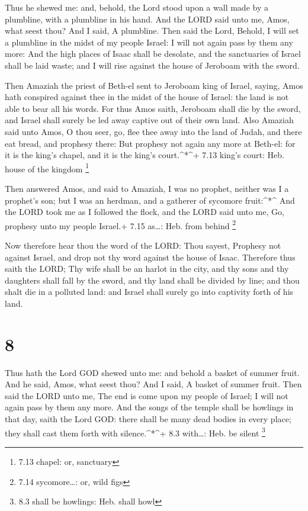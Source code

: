  Thus he shewed me: and, behold, the Lord stood upon a wall
made by a plumbline, with a plumbline in his hand.  And the
LORD said unto me, Amos, what seest thou? And I said, A plumbline. Then
said the Lord, Behold, I will set a plumbline in the midst of my people
Israel: I will not again pass by them any more:  And the
high places of Isaac shall be desolate, and the sanctuaries of Israel
shall be laid waste; and I will rise against the house of Jeroboam with
the sword.

 Then Amaziah the priest of Beth-el sent to Jeroboam king
of Israel, saying, Amos hath conspired against thee in the midst of the
house of Israel: the land is not able to bear all his words.
 For thus Amos saith, Jeroboam shall die by the sword, and
Israel shall surely be led away captive out of their own land.
 Also Amaziah said unto Amos, O thou seer, go, flee thee
away into the land of Judah, and there eat bread, and prophesy there:
 But prophesy not again any more at Beth-el: for it is the
king's chapel, and it is the king's court.\^{}*\^{}+ 7.13 king's court:
Heb. house of the kingdom \footnote{7.13 chapel: or, sanctuary}

 Then answered Amos, and said to Amaziah, I was no prophet,
neither was I a prophet's son; but I was an herdman, and a gatherer of
sycomore fruit:\^{}*\^{}  And the LORD took me as I
followed the flock, and the LORD said unto me, Go, prophesy unto my
people Israel.+ 7.15 as\ldots: Heb. from behind \footnote{7.14
  sycomore\ldots: or, wild figs}

 Now therefore hear thou the word of the LORD: Thou sayest,
Prophesy not against Israel, and drop not thy word against the house of
Isaac.  Therefore thus saith the LORD; Thy wife shall be an
harlot in the city, and thy sons and thy daughters shall fall by the
sword, and thy land shall be divided by line; and thou shalt die in a
polluted land: and Israel shall surely go into captivity forth of his
land.

\hypertarget{section-7}{%
\section{8}\label{section-7}}

 Thus hath the Lord GOD shewed unto me: and behold a basket
of summer fruit.  And he said, Amos, what seest thou? And I
said, A basket of summer fruit. Then said the LORD unto me, The end is
come upon my people of Israel; I will not again pass by them any more.
 And the songs of the temple shall be howlings in that day,
saith the Lord GOD: there shall be many dead bodies in every place; they
shall cast them forth with silence.\^{}*\^{}+ 8.3 with\ldots: Heb. be
silent \footnote{8.3 shall be howlings: Heb. shall howl}

